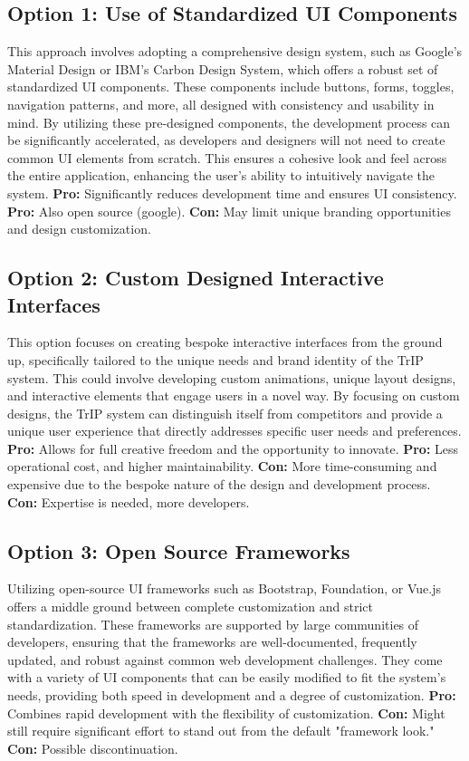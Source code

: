 \subsection*{Option 1: Use of Standardized UI Components}
This approach involves adopting a comprehensive design system, such as Google's Material Design or IBM’s Carbon Design System, which offers a robust set of standardized UI components. These components include buttons, forms, toggles, navigation patterns, and more, all designed with consistency and usability in mind. By utilizing these pre-designed components, the development process can be significantly accelerated, as developers and designers will not need to create common UI elements from scratch. This ensures a cohesive look and feel across the entire application, enhancing the user's ability to intuitively navigate the system.
\textbf{Pro:} Significantly reduces development time and ensures UI consistency.
\textbf{Pro:} Also open source (google).
\textbf{Con:} May limit unique branding opportunities and design customization.

\subsection*{Option 2: Custom Designed Interactive Interfaces}
This option focuses on creating bespoke interactive interfaces from the ground up, specifically tailored to the unique needs and brand identity of the TrIP system. This could involve developing custom animations, unique layout designs, and interactive elements that engage users in a novel way. By focusing on custom designs, the TrIP system can distinguish itself from competitors and provide a unique user experience that directly addresses specific user needs and preferences.
\textbf{Pro:} Allows for full creative freedom and the opportunity to innovate.
\textbf{Pro:} Less operational cost, and higher maintainability.
\textbf{Con:} More time-consuming and expensive due to the bespoke nature of the design and development process.
\textbf{Con:} Expertise is needed, more developers.

\subsection*{Option 3: Open Source Frameworks}
Utilizing open-source UI frameworks such as Bootstrap, Foundation, or Vue.js offers a middle ground between complete customization and strict standardization. These frameworks are supported by large communities of developers, ensuring that the frameworks are well-documented, frequently updated, and robust against common web development challenges. They come with a variety of UI components that can be easily modified to fit the system’s needs, providing both speed in development and a degree of customization.
\textbf{Pro:} Combines rapid development with the flexibility of customization.
\textbf{Con:} Might still require significant effort to stand out from the default "framework look."
\textbf{Con:} Possible discontinuation.

